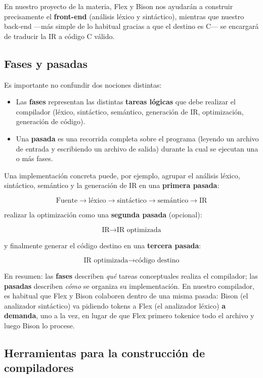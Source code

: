 \documentclass[11pt,a4paper]{article}
\begin{document}
En nuestro proyecto de la materia, Flex y Bison nos ayudarán a construir precisamente el
\textbf{front-end} (análisis léxico y sintáctico), mientras que nuestro back-end —más simple de
lo habitual gracias a que el destino es C— se encargará de traducir la IR a código C válido.

\subsection{Fases y pasadas}
\label{sec:fases-pasadas}

Es importante no confundir dos nociones distintas:

\begin{itemize}
    \item Las \textbf{fases} representan las distintas \textbf{tareas lógicas} que debe
    realizar el compilador (léxico, sintáctico, semántico, generación de IR, optimización,
    generación de código).
    \item Una \textbf{pasada} es una recorrida completa sobre el programa (leyendo un archivo de
    entrada y escribiendo un archivo de salida) durante la cual se ejecutan una o más fases.
\end{itemize}

Una implementación concreta puede, por ejemplo, agrupar el análisis léxico, sintáctico,
semántico y la generación de IR en una \textbf{primera pasada}:

\[
\text{Fuente} \rightarrow \text{léxico} \rightarrow \text{sintáctico} \rightarrow
\text{semántico} \rightarrow \text{IR}
\]

realizar la optimización como una \textbf{segunda pasada} (opcional):

\[
\text{IR} \rightarrow \text{IR optimizada}
\]

y finalmente generar el código destino en una \textbf{tercera pasada}:

\[
\text{IR optimizada} \rightarrow \text{código destino}
\]

En resumen: las \textbf{fases} describen \textit{qué} tareas conceptuales realiza el
compilador; las \textbf{pasadas} describen \textit{cómo} se organiza su implementación. En
nuestro compilador, es habitual que Flex y Bison colaboren dentro de una misma pasada: Bison
(el analizador sintáctico) va pidiendo tokens a Flex (el analizador léxico) \textbf{a demanda},
uno a la vez, en lugar de que Flex primero tokenice todo el archivo y luego Bison lo procese.

\subsection{Herramientas para la construcción de compiladores}
\label{sec:herramientas}
\end{document}

